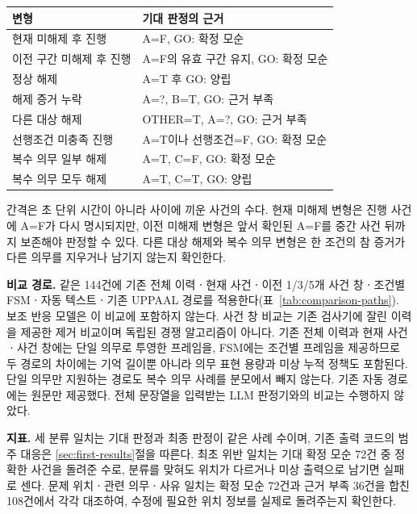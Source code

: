 \begin{revision}
\begin{table}[t]
\centering
\color{revisionblue}
\label{tab:scenario-variants}
\scriptsize
\begin{tabularx}{\columnwidth}{L{.45\columnwidth}Y}
\toprule
변형 & 기대 판정의 근거 \\
\midrule
현재 미해제 후 진행 & A=F, GO: 확정 모순 \\
이전 구간 미해제 후 진행 & A=F의 유효 구간 유지, GO: 확정 모순 \\
정상 해제 & A=T 후 GO: 양립 \\
해제 증거 누락 & A=?, B=T, GO: 근거 부족 \\
다른 대상 해제 & OTHER=T, A=?, GO: 근거 부족 \\
선행조건 미충족 진행 & A=T이나 선행조건=F, GO: 확정 모순 \\
복수 의무 일부 해제 & A=T, C=F, GO: 확정 모순 \\
복수 의무 모두 해제 & A=T, C=T, GO: 양립 \\
\bottomrule
\end{tabularx}
\end{table}

간격은 초 단위 시간이 아니라 사이에 끼운 사건의 수다. 현재 미해제 변형은 진행 사건에 A=F가 다시 명시되지만, 이전 미해제 변형은 앞서 확인된 A=F를 중간 사건 뒤까지 보존해야 판정할 수 있다. 다른 대상 해제와 복수 의무 변형은 한 조건의 참 증거가 다른 의무를 지우거나 남기지 않는지 확인한다.

\textbf{비교 경로.} 같은 144건에 기존 전체 이력ㆍ현재 사건ㆍ이전 1/3/5개 사건 창ㆍ조건별 FSMㆍ자동 텍스트ㆍ기존 UPPAAL 경로를 적용한다(표~\ref{tab:comparison-paths}). 보조 반응 모델은 이 비교에 포함하지 않는다. 사건 창 비교는 기존 검사기에 잘린 이력을 제공한 제거 비교이며 독립된 경쟁 알고리즘이 아니다. 기존 전체 이력과 현재 사건ㆍ사건 창에는 단일 의무로 투영한 프레임을, FSM에는 조건별 프레임을 제공하므로 두 경로의 차이에는 기억 길이뿐 아니라 의무 표현 용량과 미상 누적 정책도 포함된다. 단일 의무만 지원하는 경로도 복수 의무 사례를 분모에서 빼지 않는다. 기존 자동 경로에는 원문만 제공했다. 전체 문장열을 입력받는 LLM 판정기와의 비교는 수행하지 않았다.

\textbf{지표.} 세 분류 일치는 기대 판정과 최종 판정이 같은 사례 수이며, 기존 출력 코드의 범주 대응은 \ref{sec:first-results}절을 따른다. 최초 위반 일치는 기대 확정 모순 72건 중 정확한 사건을 돌려준 수로, 분류를 맞혀도 위치가 다르거나 미상 출력으로 남기면 실패로 센다. 문제 위치ㆍ관련 의무ㆍ사유 일치는 확정 모순 72건과 근거 부족 36건을 합친 108건에서 각각 대조하여, 수정에 필요한 위치 정보를 실제로 돌려주는지 확인한다.


\end{revision}
